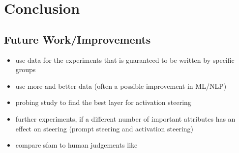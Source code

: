 \chapter{Conclusion}
\label{sec:conclusion}

\section{Future Work/Improvements} %
\begin{itemize}
  \item use data for the experiments that is guaranteed to be written by specific groups
  \item use more and better data (often a possible improvement in ML/NLP)
  \item probing study to find the best layer for activation steering
  \item further experiments, if a different number of important attributes has an effect on steering (prompt steering and activation steering)
  \item compare \ac{sfam} to human judgements like \citet{patelLearningInterpretableStyle2023}
\end{itemize}

